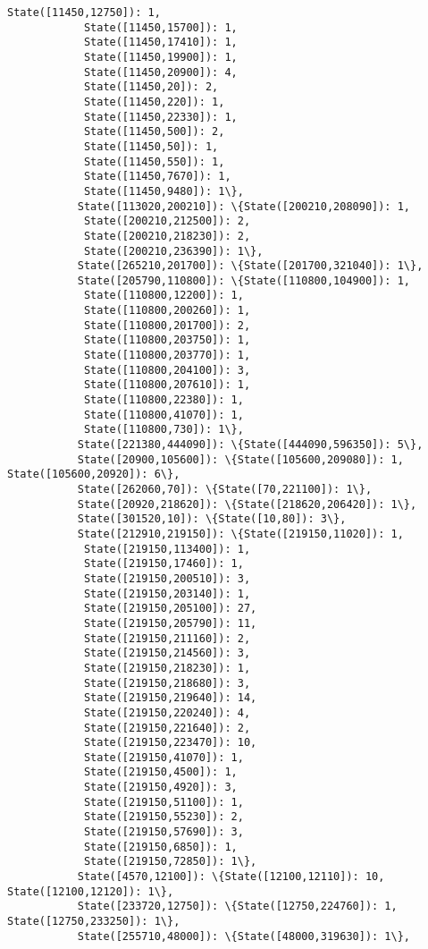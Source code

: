 \documentclass[11pt]{article}
\begin{document}
\begin{Verbatim}[commandchars=\\\{\}]
            State([11450,12750]): 1,
            State([11450,15700]): 1,
            State([11450,17410]): 1,
            State([11450,19900]): 1,
            State([11450,20900]): 4,
            State([11450,20]): 2,
            State([11450,220]): 1,
            State([11450,22330]): 1,
            State([11450,500]): 2,
            State([11450,50]): 1,
            State([11450,550]): 1,
            State([11450,7670]): 1,
            State([11450,9480]): 1\},
           State([113020,200210]): \{State([200210,208090]): 1,
            State([200210,212500]): 2,
            State([200210,218230]): 2,
            State([200210,236390]): 1\},
           State([265210,201700]): \{State([201700,321040]): 1\},
           State([205790,110800]): \{State([110800,104900]): 1,
            State([110800,12200]): 1,
            State([110800,200260]): 1,
            State([110800,201700]): 2,
            State([110800,203750]): 1,
            State([110800,203770]): 1,
            State([110800,204100]): 3,
            State([110800,207610]): 1,
            State([110800,22380]): 1,
            State([110800,41070]): 1,
            State([110800,730]): 1\},
           State([221380,444090]): \{State([444090,596350]): 5\},
           State([20900,105600]): \{State([105600,209080]): 1, State([105600,20920]): 6\},
           State([262060,70]): \{State([70,221100]): 1\},
           State([20920,218620]): \{State([218620,206420]): 1\},
           State([301520,10]): \{State([10,80]): 3\},
           State([212910,219150]): \{State([219150,11020]): 1,
            State([219150,113400]): 1,
            State([219150,17460]): 1,
            State([219150,200510]): 3,
            State([219150,203140]): 1,
            State([219150,205100]): 27,
            State([219150,205790]): 11,
            State([219150,211160]): 2,
            State([219150,214560]): 3,
            State([219150,218230]): 1,
            State([219150,218680]): 3,
            State([219150,219640]): 14,
            State([219150,220240]): 4,
            State([219150,221640]): 2,
            State([219150,223470]): 10,
            State([219150,41070]): 1,
            State([219150,4500]): 1,
            State([219150,4920]): 3,
            State([219150,51100]): 1,
            State([219150,55230]): 2,
            State([219150,57690]): 3,
            State([219150,6850]): 1,
            State([219150,72850]): 1\},
           State([4570,12100]): \{State([12100,12110]): 10, State([12100,12120]): 1\},
           State([233720,12750]): \{State([12750,224760]): 1, State([12750,233250]): 1\},
           State([255710,48000]): \{State([48000,319630]): 1\},

\end{Verbatim}
\end{document}
